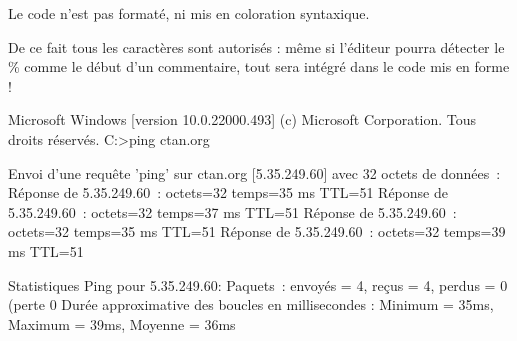 \documentclass{article}
\begin{document}
\begin{codeinfo}
Le \textsf{code} n'est pas formaté, ni mis en coloration syntaxique.

De ce fait tous les caractères sont autorisés : même si l'éditeur pourra détecter le \% comme le début d'un commentaire, tout sera intégré dans le code mis en forme !
\end{codeinfo}


\begin{codesortie}
\end{codesortie}

\begin{codetex}
\begin{PLtermwin}[15cm]{} %
Microsoft Windows [version 10.0.22000.493]
(c) Microsoft Corporation. Tous droits réservés.
C:\Users\test>ping ctan.org

Envoi d’une requête 'ping' sur ctan.org [5.35.249.60] avec 32 octets de données :
Réponse de 5.35.249.60 : octets=32 temps=35 ms TTL=51
Réponse de 5.35.249.60 : octets=32 temps=37 ms TTL=51
Réponse de 5.35.249.60 : octets=32 temps=35 ms TTL=51
Réponse de 5.35.249.60 : octets=32 temps=39 ms TTL=51

Statistiques Ping pour 5.35.249.60:
Paquets : envoyés = 4, reçus = 4, perdus = 0 (perte 0%
Durée approximative des boucles en millisecondes :
Minimum = 35ms, Maximum = 39ms, Moyenne = 36ms
\end{PLtermwin}

\end{codetex}
\end{document}
